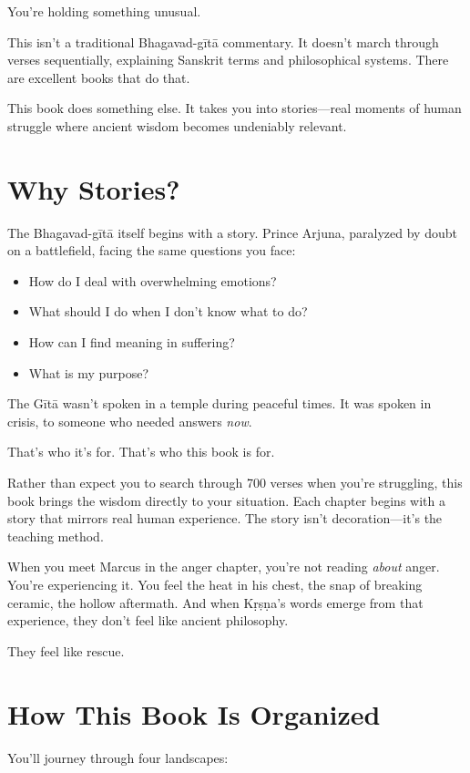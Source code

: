 \documentclass[11pt,twoside]{book}
\begin{document}
You're holding something unusual.

This isn't a traditional Bhagavad-gītā commentary. It doesn't march through verses sequentially, explaining Sanskrit terms and philosophical systems. There are excellent books that do that.

This book does something else. It takes you into stories—real moments of human struggle where ancient wisdom becomes undeniably relevant.

\section*{Why Stories?}

The Bhagavad-gītā itself begins with a story. Prince Arjuna, paralyzed by doubt on a battlefield, facing the same questions you face:

\begin{itemize}
\item How do I deal with overwhelming emotions?
\item What should I do when I don't know what to do?
\item How can I find meaning in suffering?
\item What is my purpose?
\end{itemize}

The Gītā wasn't spoken in a temple during peaceful times. It was spoken in crisis, to someone who needed answers \textit{now}.

That's who it's for. That's who this book is for.

Rather than expect you to search through 700 verses when you're struggling, this book brings the wisdom directly to your situation. Each chapter begins with a story that mirrors real human experience. The story isn't decoration—it's the teaching method.

When you meet Marcus in the anger chapter, you're not reading \textit{about} anger. You're experiencing it. You feel the heat in his chest, the snap of breaking ceramic, the hollow aftermath. And when Kṛṣṇa's words emerge from that experience, they don't feel like ancient philosophy.

They feel like rescue.

\section*{How This Book Is Organized}

You'll journey through four landscapes:
\end{document}

